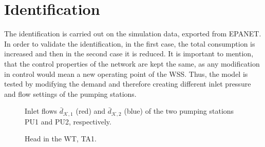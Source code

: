 \section{Identification}
\label{NN_based_example1} 

The identification is carried out on the simulation data, exported from EPANET. In order to validate the identification, in the first case, the total consumption is increased and then in the second case it is reduced. It is important to mention, that the control properties of the network are kept the same, as any modification in control would mean a new operating point of the WSS. Thus, the model is tested by modifying the demand and therefore creating different inlet pressure and flow settings of the pumping stations.  

\newpage


 \begin{figure}[h!]
 \centering
  
 \label{fig:inlet_flows_example1}
 \end{figure}

\vspace{-8mm}

 \begin{figure}[h!]
 \centering
 \hspace{0.15mm}
  
 \vspace{-1.5mm}
 \caption{Inlet flows $\bar{d}_{\mathcal{K},1}$ (red) and $\bar{d}_{\mathcal{K},2}$ (blue) of the two pumping stations PU1 and PU2, respectively.}
 \label{fig:inlet_flows_example1}
 \end{figure}

 

\vspace{-3mm}

 \begin{figure}[H]
 \centering
  
 \vspace{-1.5mm}
 \caption{Head in the WT, TA1.}
 \label{fig:WT_head_example}
 \end{figure}

 \vspace{-3mm}

